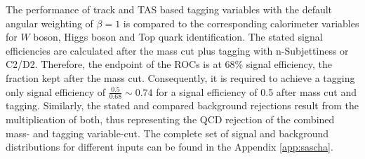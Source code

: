 
The performance of track and TAS based tagging variables with the default angular weighting of $\beta=1$ is compared to the corresponding calorimeter variables for $W$ boson, Higgs boson and Top quark identification. 
The stated signal efficiencies are calculated after the mass cut plus tagging with n-Subjettiness or C2/D2. Therefore, the endpoint of the ROCs is at 68\% signal efficiency, the fraction kept after the mass cut. Consequently, it is required to achieve a tagging only signal efficiency of $\frac{0.5}{0.68} \sim 0.74$ for a signal efficiency of 0.5 after mass cut and tagging. Similarly, the stated and compared background rejections result from the multiplication of both, thus representing the QCD rejection of the combined mass- and tagging variable-cut. 
The complete set of signal and background distributions for different inputs can be found in the Appendix \ref{app:sascha}.

